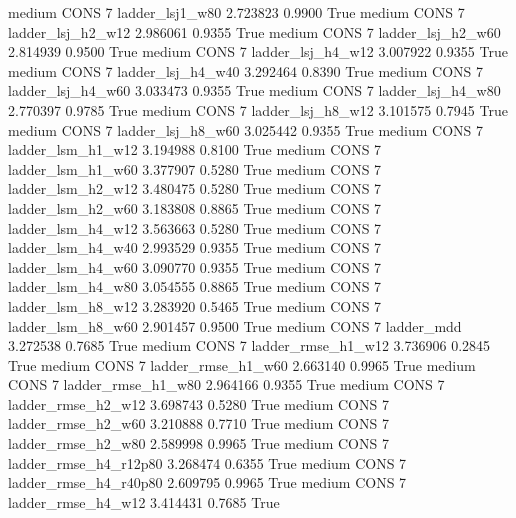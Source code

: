     medium     CONS                 7        ladder_lsj1_w80   2.723823      0.9900    True
    medium     CONS                 7      ladder_lsj_h2_w12   2.986061      0.9355    True
    medium     CONS                 7      ladder_lsj_h2_w60   2.814939      0.9500    True
    medium     CONS                 7      ladder_lsj_h4_w12   3.007922      0.9355    True
    medium     CONS                 7      ladder_lsj_h4_w40   3.292464      0.8390    True
    medium     CONS                 7      ladder_lsj_h4_w60   3.033473      0.9355    True
    medium     CONS                 7      ladder_lsj_h4_w80   2.770397      0.9785    True
    medium     CONS                 7      ladder_lsj_h8_w12   3.101575      0.7945    True
    medium     CONS                 7      ladder_lsj_h8_w60   3.025442      0.9355    True
    medium     CONS                 7      ladder_lsm_h1_w12   3.194988      0.8100    True
    medium     CONS                 7      ladder_lsm_h1_w60   3.377907      0.5280    True
    medium     CONS                 7      ladder_lsm_h2_w12   3.480475      0.5280    True
    medium     CONS                 7      ladder_lsm_h2_w60   3.183808      0.8865    True
    medium     CONS                 7      ladder_lsm_h4_w12   3.563663      0.5280    True
    medium     CONS                 7      ladder_lsm_h4_w40   2.993529      0.9355    True
    medium     CONS                 7      ladder_lsm_h4_w60   3.090770      0.9355    True
    medium     CONS                 7      ladder_lsm_h4_w80   3.054555      0.8865    True
    medium     CONS                 7      ladder_lsm_h8_w12   3.283920      0.5465    True
    medium     CONS                 7      ladder_lsm_h8_w60   2.901457      0.9500    True
    medium     CONS                 7             ladder_mdd   3.272538      0.7685    True
    medium     CONS                 7     ladder_rmse_h1_w12   3.736906      0.2845    True
    medium     CONS                 7     ladder_rmse_h1_w60   2.663140      0.9965    True
    medium     CONS                 7     ladder_rmse_h1_w80   2.964166      0.9355    True
    medium     CONS                 7     ladder_rmse_h2_w12   3.698743      0.5280    True
    medium     CONS                 7     ladder_rmse_h2_w60   3.210888      0.7710    True
    medium     CONS                 7     ladder_rmse_h2_w80   2.589998      0.9965    True
    medium     CONS                 7  ladder_rmse_h4_r12p80   3.268474      0.6355    True
    medium     CONS                 7  ladder_rmse_h4_r40p80   2.609795      0.9965    True
    medium     CONS                 7     ladder_rmse_h4_w12   3.414431      0.7685    True

